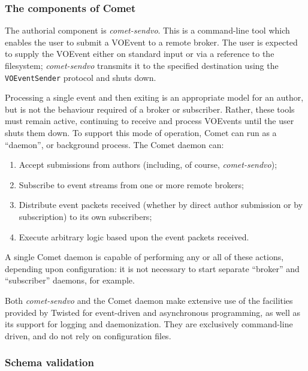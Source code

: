 \documentclass[5p,authoryear]{elsarticle}
\begin{document}
\subsubsection{The components of Comet}
\label{sec:design:components}

The authorial component is \textit{comet-sendvo}. This is a command-line tool
which enables the user to submit a VOEvent to a remote broker. The user is
expected to supply the VOEvent either on standard input or via a reference to
the filesystem; \textit{comet-sendvo} transmits it to the specified
destination using the \texttt{VOEventSender} protocol and shuts down.

Processing a single event and then exiting is an appropriate model for an
author, but is not the behaviour required of a broker or subscriber. Rather,
these tools must remain active, continuing to receive and process VOEvents
until the user shuts them down. To support this mode of operation, Comet can
run as a ``daemon'', or background process. The Comet daemon can:

\begin{enumerate}

  \item{Accept submissions from authors (including, of course, \textit{comet-sendvo});}

  \item{Subscribe to event streams from one or more remote brokers;}

  \item{Distribute event packets received (whether by direct author submission or by subscription) to its own subscribers;}

  \item{Execute arbitrary logic based upon the event packets received.}

\end{enumerate}

A single Comet daemon is capable of performing any or all of these actions,
depending upon configuration: it is not necessary to start separate ``broker''
and ``subscriber'' daemons, for example.

Both \textit{comet-sendvo} and the Comet daemon make extensive use of the
facilities provided by Twisted for event-driven and asynchronous programming,
as well as its support for logging and daemonization. They are exclusively
command-line driven, and do not rely on configuration files.

\subsubsection{Schema validation}
\label{sec:design:schema}
\end{document}
